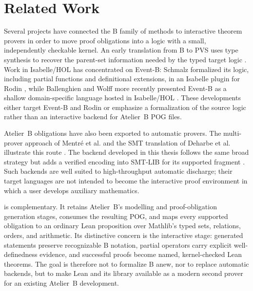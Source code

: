 \section{Related Work}
\label{sec:barrel-related-work}

Several projects have connected the B family of methods to interactive theorem
provers in order to move proof obligations into a logic with a small,
independently checkable kernel.  An early translation from B to PVS uses type
synthesis to recover the parent-set information needed by the typed target
logic \cite{Bodeveix2002BtoPVS}.  Work in Isabelle/HOL has concentrated on
Event-B: Schmalz formalized its logic, including partial functions and
definitional extensions, in an Isabelle plugin for Rodin
\cite{Schmalz2012RodinIsabelle}, while Ballenghien and Wolff more recently
presented Event-B as a shallow domain-specific language hosted in Isabelle/HOL
\cite{Wolff2024EB_Isabelle}.  These developments either target Event-B and
Rodin or emphasize a formalization of the source logic rather than an
interactive backend for Atelier~B POG files.

Atelier~B obligations have also been exported to automatic provers.  The
multi-prover approach of Mentr\'e et al. and the SMT translation of Deharbe et
al. illustrate this route \cite{mentre2012discharging,deharbe2010automatic}.
The \beer backend developed in this thesis follows the same broad strategy but
adds a verified encoding into SMT-LIB for its supported fragment
\cite{trelat2025beer}.  Such backends are well suited to high-throughput
automatic discharge; their target languages are not intended to become the
interactive proof environment in which a user develops auxiliary mathematics.

\barrel is complementary.  It retains Atelier~B's modelling and
proof-obligation generation stages, consumes the resulting POG, and maps every
supported obligation to an ordinary Lean proposition over Mathlib's typed
sets, relations, orders, and arithmetic.  Its distinctive concern is the
interactive stage: generated statements preserve recognizable B notation,
partial operators carry explicit well-definedness evidence, and successful
proofs become named, kernel-checked Lean theorems.  The goal is therefore not
to formalize B anew, nor to replace automatic backends, but to make Lean and
its library available as a modern second prover for an existing Atelier~B
development.
